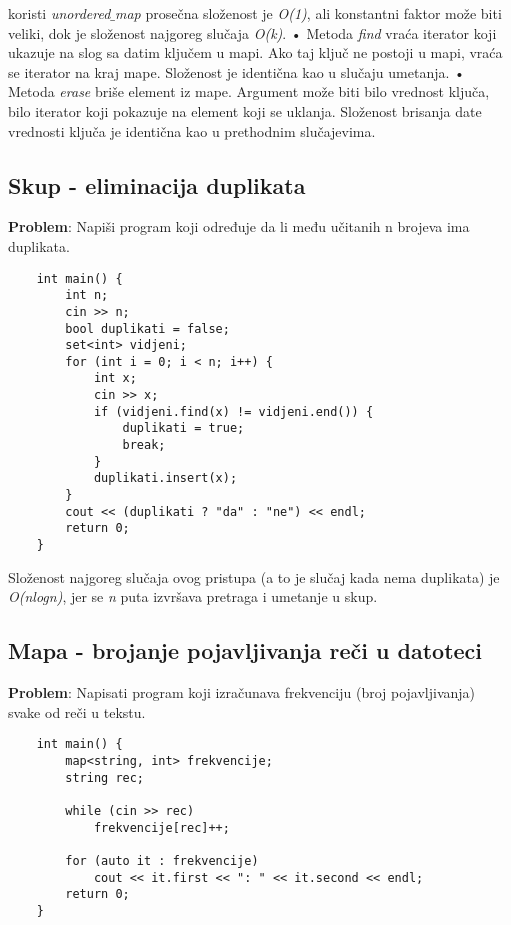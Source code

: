 \documentclass{article}
\begin{document}
koristi \textit{unordered$\_$map} prosečna složenost je \textit{O(1)}, ali konstantni faktor
može biti veliki, dok je složenost najgoreg slučaja \textit{O(k)}.
\newline \hspace*{0.4cm}• Metoda \textit{find} vraća iterator koji ukazuje na slog sa datim ključem u mapi.
Ako taj ključ ne postoji u mapi, vraća se iterator na kraj mape. Složenost je identična kao u slučaju umetanja.
\newline \hspace*{0.4cm}• Metoda \textit{erase} briše element iz mape. Argument može biti bilo vrednost
ključa, bilo iterator koji pokazuje na element koji se uklanja. Složenost
brisanja date vrednosti ključa je identična kao u prethodnim slučajevima.

\subsection{Skup - eliminacija duplikata}
\textbf{Problem}: Napiši program koji određuje da li među učitanih n brojeva ima
duplikata.
\begin{lstlisting}
    int main() {
        int n;
        cin >> n;
        bool duplikati = false;
        set<int> vidjeni;
        for (int i = 0; i < n; i++) {
            int x;
            cin >> x;
            if (vidjeni.find(x) != vidjeni.end()) {
                duplikati = true;
                break;
            }
            duplikati.insert(x);
        }
        cout << (duplikati ? "da" : "ne") << endl;
        return 0;
    }
\end{lstlisting}
Složenost najgoreg slučaja ovog pristupa (a to je slučaj kada nema duplikata) je
\textit{O(nlogn)}, jer se \textit{n} puta izvršava pretraga i umetanje u skup.

\subsection{Mapa - brojanje pojavljivanja reči u datoteci}
\textbf{Problem}: Napisati program koji izračunava frekvenciju (broj pojavljivanja)
svake od reči u tekstu.
\begin{lstlisting}
    int main() {
        map<string, int> frekvencije;
        string rec;
        
        while (cin >> rec)
            frekvencije[rec]++;
            
        for (auto it : frekvencije)
            cout << it.first << ": " << it.second << endl;
        return 0;
    }
\end{lstlisting}
\end{document}
